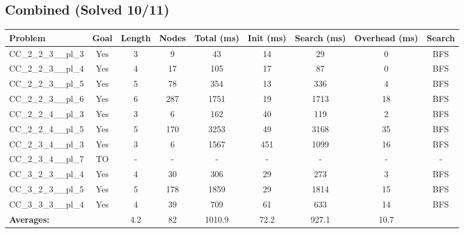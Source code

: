 \documentclass{article}
\begin{document}
\subsection*{Combined (Solved 10/11)}
\begin{tabular}{lcccccccc}
\toprule
Problem & Goal & Length & Nodes & Total (ms) & Init (ms) & Search (ms) & Overhead (ms) & Search \\
\midrule
CC\_2\_2\_3\_\_pl\_3 & Yes & 3 & 9 & 43 & 14 & 29 & 0 & BFS \\
CC\_2\_2\_3\_\_pl\_4 & Yes & 4 & 17 & 105 & 17 & 87 & 0 & BFS \\
CC\_2\_2\_3\_\_pl\_5 & Yes & 5 & 78 & 354 & 13 & 336 & 4 & BFS \\
CC\_2\_2\_3\_\_pl\_6 & Yes & 6 & 287 & 1751 & 19 & 1713 & 18 & BFS \\
CC\_2\_2\_4\_\_pl\_3 & Yes & 3 & 6 & 162 & 40 & 119 & 2 & BFS \\
CC\_2\_2\_4\_\_pl\_5 & Yes & 5 & 170 & 3253 & 49 & 3168 & 35 & BFS \\
CC\_2\_3\_4\_\_pl\_3 & Yes & 3 & 6 & 1567 & 451 & 1099 & 16 & BFS \\
CC\_2\_3\_4\_\_pl\_7 & TO & - & - & - & - & - & - & - \\
CC\_3\_2\_3\_\_pl\_4 & Yes & 4 & 30 & 306 & 29 & 273 & 3 & BFS \\
CC\_3\_2\_3\_\_pl\_5 & Yes & 5 & 178 & 1859 & 29 & 1814 & 15 & BFS \\
CC\_3\_3\_3\_\_pl\_4 & Yes & 4 & 39 & 709 & 61 & 633 & 14 & BFS \\
\textbf{Averages:} & & 4.2 & 82 & 1010.9 & 72.2 & 927.1 & 10.7 & \\
\bottomrule
\end{tabular}
\\[0.7cm]
\end{document}
